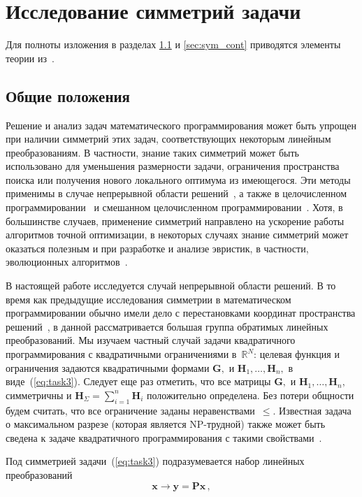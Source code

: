 \section{Исследование симметрий задачи}

Для полноты изложения в разделах \ref{sec:sym_common} и \ref{sec:sym_cont} приводятся элементы теории из~\cite{yurkov:symmetry}.
\subsection{Общие положения}
\label{sec:sym_common}
Решение и анализ задач математического программирования может быть упрощен при наличии симметрий этих задач, соответствующих некоторым линейным преобразованиям. В частности, знание таких симметрий может быть использовано для уменьшения размерности задачи, ограничения пространства поиска или получения нового локального оптимума из имеющегося. Эти методы применимы в
случае непрерывной области решений~\cite{CHL13,GATERMANN200495,KWM19}, а также в целочисленном программировании~\cite{BHJ13,C99,Kolokolov2012,Margot2010,Simanchev96} и смешанном целочисленном программировании~\cite{L12,PR19}.
Хотя, в большинстве случаев, применение симметрий направлено на ускорение работы алгоритмов точной оптимизации, в некоторых случаях знание симметрий может оказаться полезным и при разработке и анализе эвристик, в частности, эволюционных алгоритмов~\cite{Doerr21,Adam2004}.

В настоящей работе исследуется случай непрерывной области решений. В то время как предыдущие исследования симметрии в математическом программировании обычно имели дело с перестановками координат пространства решений~\cite{Kolokolov2012,KWM19,L12}, в данной рассматривается большая группа обратимых линейных преобразований. Мы изучаем частный случай задачи квадратичного программирования с квадратичными ограничениями в~${\mathbb R}^N$: целевая функция и ограничения задаются квадратичными формами $\textbf{G}, $ и $\textbf{H}_1,\dots,\textbf{H}_n,$ в виде~(\ref{eq:task3}). Следует еще раз отметить, что все матрицы $\textbf{G}, $ и $\textbf{H}_1,\dots,\textbf{H}_n,$ симметричны и $\textbf{H}_\Sigma = \sum_{i=1}^{n}\textbf{H}_i$ положительно определена.
Без потери общности будем считать, что все ограничение заданы неравенствами~$\le$.
Известная задача о максимальном разрезе (которая является NP-трудной) также может быть сведена к задаче квадратичного программирования с такими свойствами~\cite{Shor1998}.

Под симметрией задачи~(\ref{eq:task3}) подразумевается набор линейных преобразований
\begin{equation}
\label{eq:Lin}
\textbf{x} \to \textbf{y}=\textbf{Px} \, ,
\end{equation}
%

